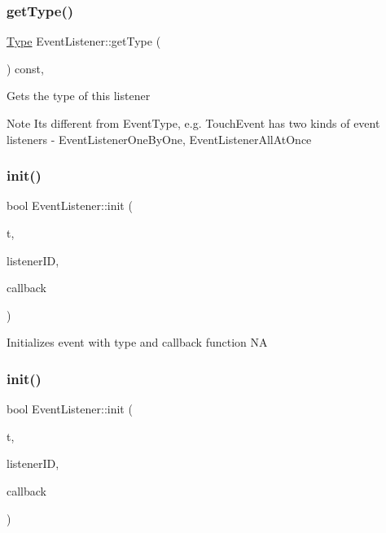 \subsubsection{\texorpdfstring{get\+Type()}{getType()}\hspace{0.1cm}{\footnotesize\ttfamily [2/2]}}
{\footnotesize\ttfamily \hyperlink{classEventListener_ab78e6acdfa2343490eda9e92d1555ee4}{Type} Event\+Listener\+::get\+Type (\begin{DoxyParamCaption}\item[{void}]{ }\end{DoxyParamCaption}) const\hspace{0.3cm}{\ttfamily [inline]}, {\ttfamily [protected]}}

Gets the type of this listener \begin{DoxyNote}{Note}
It\textquotesingle{}s different from {\ttfamily Event\+Type}, e.\+g. Touch\+Event has two kinds of event listeners -\/ Event\+Listener\+One\+By\+One, Event\+Listener\+All\+At\+Once 
\end{DoxyNote}
\mbox{\label{classEventListener_a4acf01a750bd53ff94f7d7fb38a8b88d}} 
\subsubsection{\texorpdfstring{init()}{init()}\hspace{0.1cm}{\footnotesize\ttfamily [1/2]}}
{\footnotesize\ttfamily bool Event\+Listener\+::init (\begin{DoxyParamCaption}\item[{\hyperlink{classEventListener_ab78e6acdfa2343490eda9e92d1555ee4}{Type}}]{t,  }\item[{const Listener\+ID \&}]{listener\+ID,  }\item[{const std\+::function$<$ void(\hyperlink{classEvent}{Event} $\ast$)$>$ \&}]{callback }\end{DoxyParamCaption})}

Initializes event with type and callback function  NA \mbox{\label{classEventListener_a4acf01a750bd53ff94f7d7fb38a8b88d}} 
\subsubsection{\texorpdfstring{init()}{init()}\hspace{0.1cm}{\footnotesize\ttfamily [2/2]}}
{\footnotesize\ttfamily bool Event\+Listener\+::init (\begin{DoxyParamCaption}\item[{\hyperlink{classEventListener_ab78e6acdfa2343490eda9e92d1555ee4}{Type}}]{t,  }\item[{const Listener\+ID \&}]{listener\+ID,  }\item[{const std\+::function$<$ void(\hyperlink{classEvent}{Event} $\ast$)$>$ \&}]{callback }\end{DoxyParamCaption})}


